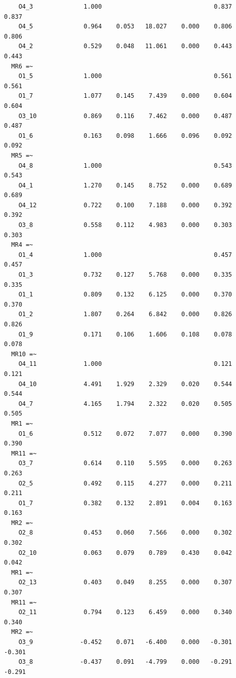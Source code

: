 \documentclass[
  letterpaper,
  DIV=11,
  numbers=noendperiod]{scrartcl}
\begin{document}
\begin{verbatim}
    O4_3              1.000                               0.837    0.837
    O4_5              0.964    0.053   18.027    0.000    0.806    0.806
    O4_2              0.529    0.048   11.061    0.000    0.443    0.443
  MR6 =~                                                                
    O1_5              1.000                               0.561    0.561
    O1_7              1.077    0.145    7.439    0.000    0.604    0.604
    O3_10             0.869    0.116    7.462    0.000    0.487    0.487
    O1_6              0.163    0.098    1.666    0.096    0.092    0.092
  MR5 =~                                                                
    O4_8              1.000                               0.543    0.543
    O4_1              1.270    0.145    8.752    0.000    0.689    0.689
    O4_12             0.722    0.100    7.188    0.000    0.392    0.392
    O3_8              0.558    0.112    4.983    0.000    0.303    0.303
  MR4 =~                                                                
    O1_4              1.000                               0.457    0.457
    O1_3              0.732    0.127    5.768    0.000    0.335    0.335
    O1_1              0.809    0.132    6.125    0.000    0.370    0.370
    O1_2              1.807    0.264    6.842    0.000    0.826    0.826
    O1_9              0.171    0.106    1.606    0.108    0.078    0.078
  MR10 =~                                                               
    O4_11             1.000                               0.121    0.121
    O4_10             4.491    1.929    2.329    0.020    0.544    0.544
    O4_7              4.165    1.794    2.322    0.020    0.505    0.505
  MR1 =~                                                                
    O1_6              0.512    0.072    7.077    0.000    0.390    0.390
  MR11 =~                                                               
    O3_7              0.614    0.110    5.595    0.000    0.263    0.263
    O2_5              0.492    0.115    4.277    0.000    0.211    0.211
    O1_7              0.382    0.132    2.891    0.004    0.163    0.163
  MR2 =~                                                                
    O2_8              0.453    0.060    7.566    0.000    0.302    0.302
    O2_10             0.063    0.079    0.789    0.430    0.042    0.042
  MR1 =~                                                                
    O2_13             0.403    0.049    8.255    0.000    0.307    0.307
  MR11 =~                                                               
    O2_11             0.794    0.123    6.459    0.000    0.340    0.340
  MR2 =~                                                                
    O3_9             -0.452    0.071   -6.400    0.000   -0.301   -0.301
    O3_8             -0.437    0.091   -4.799    0.000   -0.291   -0.291


\end{verbatim}
\end{document}
